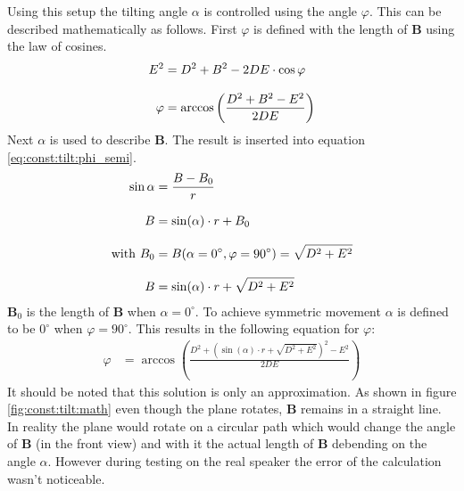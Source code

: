 \p
Using this setup the tilting angle $\alpha$ is controlled using the angle $\varphi$. This can be described mathematically as follows. First $\varphi$ is defined with the length of \textbf{B} using the law of cosines.
%
\begin{align}
  E^2     &= D^2 + B^2 - 2DE \cdot \cos \varphi \pmath
  \varphi &= \arccos \left( \frac{D^2 + B^2 - E^2}{2DE} \right) \label{eq:const:tilt:phi_semi}
\end{align}
%
Next $\alpha$ is used to describe \textbf{B}. The result is inserted into equation \ref{eq:const:tilt:phi_semi}.
%
\begin{align}
  \sin \alpha &= \frac{B - B_0}{r}\pmath
  B           &= \sin (\alpha) \cdot r + B_0\pmath
  \mathrm{with~} B_0 &= B(\alpha = 0^\circ, \varphi = 90^\circ) = \sqrt{D^2 + E^2}\pmath
  B           &= \sin (\alpha) \cdot r + \sqrt{D^2 + E^2}
\end{align}
%
\textbf{B$_0$} is the length of \textbf{B} when $\alpha = 0^\circ$. To achieve symmetric movement $\alpha$ is defined to be $0^\circ$ when $\varphi = 90^\circ$. This results in the following equation for $\varphi$:
%
\begin{align}
  \varphi &= \arccos \left( \frac{D^2 + (\sin (\alpha) \cdot r + \sqrt{D^2 + E^2})^2 - E^2}{2DE} \right)
\end{align}
%
It should be noted that this solution is only an approximation. As shown in figure \ref{fig:const:tilt:math} even though the plane rotates, \textbf{B} remains in a straight line. In reality the plane would rotate on a circular path which would change the angle of \textbf{B} (in the front view) and with it the actual length of \textbf{B} debending on the angle $\alpha$. However during testing on the real speaker the error of the calculation wasn't noticeable.